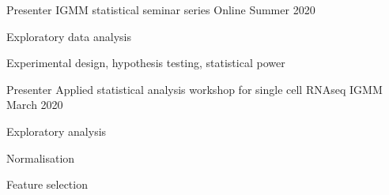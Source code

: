 


\begin{cventries}


\cventry
{Presenter} %
{IGMM statistical seminar series} %
{Online} %
{Summer 2020} %
{ %
  \begin{cvitems}
    \item {
      Exploratory data analysis
    }
    \item {
      Experimental design, hypothesis testing, statistical power
    }
  \end{cvitems}
}


\cventry
{Presenter} %
{Applied statistical analysis workshop for single cell RNAseq} %
{IGMM} %
{March 2020} %
{ %
  \begin{cvitems}
    \item 
      Exploratory analysis
    \item 
      Normalisation
    \item 
      Feature selection
  \end{cvitems}
}






\end{cventries}
